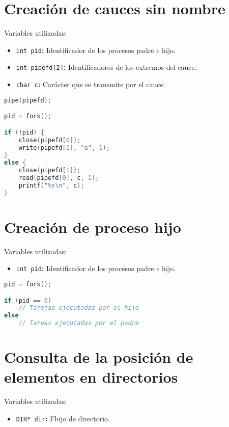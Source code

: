 \pagebreak

\section{Creación de cauces sin nombre}

Variables utilizadas:

\begin{itemize}
	\item\texttt{int pid}\textbf{:} Identificador de los procesos padre e hijo.
	\item\texttt{int pipefd[2]}\textbf{:} Identificadores de los extremos del cauce.
	\item\texttt{char c}\textbf{:} Carácter que se transmite por el cauce.
\end{itemize}

\begin{lstlisting}[language=C]
pipe(pipefd);

pid = fork();

if (!pid) {
	close(pipefd[0]);
	write(pipefd[1], "a", 1);
}
else {
	close(pipefd[1]);
	read(pipefd[0], c, 1);
	printf("%s\n", c);
}
\end{lstlisting}

\section{Creación de proceso hijo}

Variables utilizadas:

\begin{itemize}
	\item\texttt{int pid}\textbf{:} Identificador de los procesos padre e hijo.
\end{itemize}

\begin{lstlisting}[language=C]
pid = fork();

if (pid == 0)
	// Tarejas ejecutadas por el hijo
else
	// Tareas ejecutadas por el padre
\end{lstlisting}

\section{Consulta de la posición de elementos en directorios}

Variables utilizadas:

\begin{itemize}
	\item\texttt{DIR* dir}\textbf{:} Flujo de directorio.
\end{itemize}


